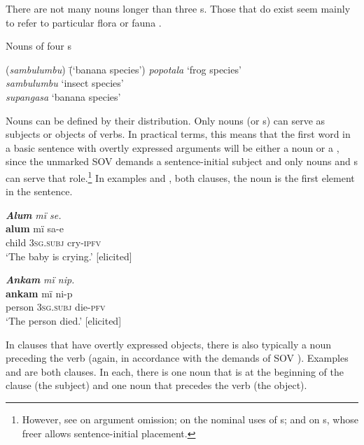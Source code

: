 There are not many nouns longer than three s. Those that do exist seem mainly to refer to particular flora or fauna .

\ea%
    \label{ex:nouns:4}
            Nouns of four s\\
\begin{tabbing}
{(\textit{sambulumbu})} \= {(‘banana species’)}\kill
{\textit{popotala}} \> {‘frog species’}\\
{\textit{sambulumbu}} \> {‘insect species’}\\
{\textit{supangasa}} \> {‘banana species’}
\end{tabbing}
\z

  Nouns can be defined by their distribution. Only nouns (or s) can serve as subjects or objects of verbs. In practical terms, this means that the first word in a basic  sentence with overtly expressed arguments will be either a noun or a , since the unmarked SOV  demands a sentence-initial subject and only nouns and s can serve that role.\footnote{However, see  on argument omission;  on the nominal uses of s; and  on s, whose freer  allows sentence-initial placement.} In examples  and , both  clauses, the noun is the first element in the sentence.

\ea%
    \label{ex:nouns:5}
            \textbf{\textit{Alum}} \textit{mï se.}\\
    \gll \textbf{alum}  mï      sa-e\\
    child  3\textsc{sg.subj}  cry-\textsc{ipfv}\\
\glt `The baby is crying.’ [elicited]
\z

 \ea%
    \label{ex:nouns:6}
           \textbf{\textit{Ankam}} \textit{mï nip.}\\
    \gll \textbf{ankam}  mï      ni-p\\
    person  3\textsc{sg.subj}  die-\textsc{pfv}\\
\glt ‘The person died.’ [elicited]
\z
  
  In  clauses that have overtly expressed objects, there is also typically a noun preceding the verb (again, in accordance with the demands of SOV ). Examples  and  are both  clauses. In each, there is one noun that is at the beginning of the clause (the subject) and one noun that precedes the verb (the object).

